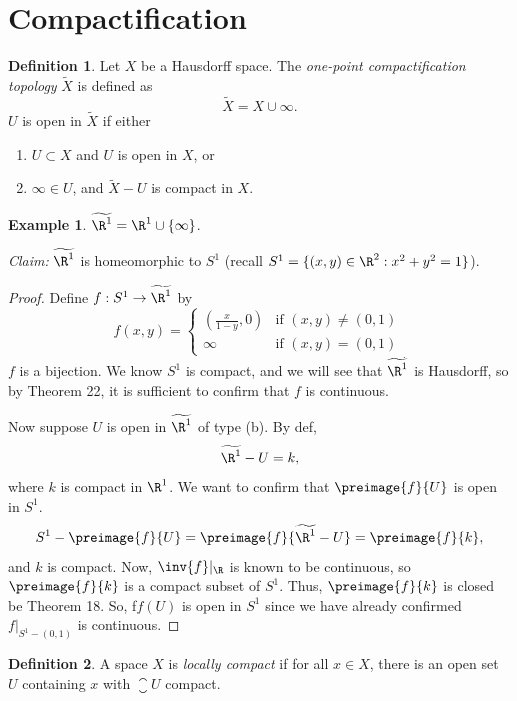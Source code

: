 \documentclass[a5paper]{article}
\theoremstyle{definition}%
\newtheorem*{definition*}{Definition}
\newtheorem*{example*}{Example}
\numberwithin{exercise}{section}
\theoremstyle{remark}%
\begin{document}
\pagebreak
\section{Compactification}

\begin{highlight}
\begin{definition*}
Let $X$ be a Hausdorff space. The \emph{one-point compactification topology} $\tilde{X}$ is defined as 
$$\tilde{X}=X\cup\infty.$$
$U$ is open in $\tilde{X}$ if either 
\begin{enumerate}[label=(\alph*)]
\item $U\subset X$ and $U$ is open in $X$, or 
\item $\infty\in U$, and $\tilde{X}-U$ is compact in $X$. 
\end{enumerate}
\end{definition*}
\end{highlight}

\begin{example*}
$\widetilde{\R^1}=\R^1\cup \{\infty\}$. 
\end{example*}

\noindent \emph{Claim:} $\widetilde{\R^1}$ is homeomorphic to $S^1$ (recall $S^1=\{(x,y)\in \R^2 : x^2+y^2=1\}$). 
\begin{proof}
Define $f:S^1 \to \widetilde{\R^1}$ by 
$$f(x,y)=
\begin{cases}
\left( \frac{x}{1-y}, 0 \right) & \text{if }(x,y)\neq(0,1)\\
\infty & \text{if } (x,y)=(0,1)
\end{cases}_.
$$
$f$ is a bijection. We know $S^1$ is compact, and we will see that $\widetilde{\R^1}$ is Hausdorff, so by Theorem 22, it is sufficient to confirm that $f$ is continuous. 

Now suppose $U$ is open in $\widetilde{\R^1}$ of type (b). By def, 
$$\widetilde{\R^1}-U=k,$$
where $k$ is compact in $\R^1$. We want to confirm that $\preimage{f}{U}$ is open in $S^1$. 
$$S^1-\preimage{f}{U}=\preimage{f}{\widetilde{\R^1}-U}=\preimage{f}{k},$$
and $k$ is compact. Now, $\inv{f}|_\R$ is known to be continuous, so $\preimage{f}{k}$ is a compact subset of $S^1$. Thus, $\preimage{f}{k}$ is closed be Theorem 18. So, f$f(U)$ is open in $S^1$ since we have already confirmed $f|_{S^1-(0,1)}$ is continuous. 
\end{proof}

\begin{highlight}
\begin{definition*}
A space $X$ is \emph{locally compact} if for all $x\in X$, there is an open set $U$ containing $x$ with $\closure{U}$ compact. 
\end{definition*}
\end{highlight}
\end{document}
